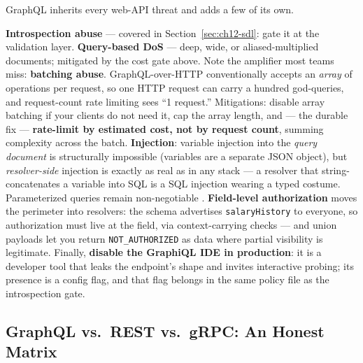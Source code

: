 GraphQL inherits every web-API threat and adds a few of its own.

\textbf{Introspection abuse} --- covered in
Section~\ref{sec:ch12-sdl}: gate it at the validation layer.
\textbf{Query-based DoS} --- deep, wide, or aliased-multiplied documents;
mitigated by the cost gate above. Note the amplifier most teams miss:
\textbf{batching abuse}. GraphQL-over-HTTP conventionally accepts an
\emph{array} of operations per request, so one HTTP request can carry a
hundred god-queries, and request-count rate limiting sees ``1 request.''
Mitigations: disable array batching if your clients do not need it, cap
the array length, and --- the durable fix --- \textbf{rate-limit by
estimated cost, not by request count}, summing complexity across the
batch. \textbf{Injection}: variable injection into the \emph{query
document} is structurally impossible (variables are a separate JSON
object), but \emph{resolver-side} injection is exactly as real as in any
stack --- a resolver that string-concatenates a variable into SQL is a SQL
injection wearing a typed costume. Parameterized queries remain
non-negotiable \cite{kleppmann2017ddia}. \textbf{Field-level
authorization} moves the perimeter into resolvers: the schema advertises
\texttt{salaryHistory} to everyone, so authorization must live at the
field, via context-carrying checks --- and union payloads let you return
\texttt{NOT\_AUTHORIZED} as data where partial visibility is legitimate.
Finally, \textbf{disable the GraphiQL IDE in production}: it is a
developer tool that leaks the endpoint's shape and invites interactive
probing; its presence is a config flag, and that flag belongs in the same
policy file as the introspection gate.

\subsection{GraphQL vs.\ REST vs.\ gRPC: An Honest Matrix}
\label{sec:ch12-comparison}

